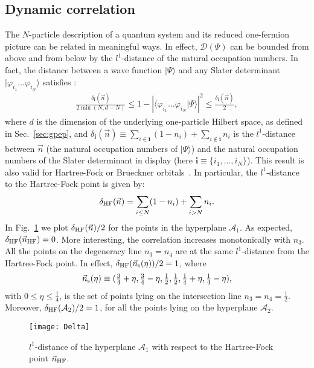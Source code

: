 \documentclass[aps,twocolumn,showpacs,pra,superscriptaddress,floatfix,longbibliography]{revtex4-1}
\newcommand{\7}{\dagger}
\newcommand{\bra}[1]{\mbox{$\langle #1 |$}}
\newcommand{\ket}[1]{\mbox{$| #1 \rangle$}}
\newcommand{\ii}{\bm{i}}
\begin{document}
  \subsection{Dynamic correlation}
  
The $N$-particle description of a quantum system 
 and its reduced one-fermion picture can be
related in meaningful ways. In effect, 
$\mathcal{D}(\Psi)$
can be bounded from above and from below by the 
$l^1$-distance of the natural occupation numbers. In fact, the 
distance between a wave function  $\ket{\Psi}$ and any 
Slater determinant $\ket{\varphi_{i_1}\dots\varphi_{i_N}}$
satisfies \cite{CS2013}:
\begin{align}
\frac{\delta_{\ii}(\vec n)}{2 \min (N,d-N) } \leq 1 - | 
\bra{\varphi_{i_1}\dots\varphi_{i_N}} \Psi\rangle|^2 \leq 
\frac{\delta_{\ii}(\vec n)}2,
\end{align}
where $d$ is the dimension of the underlying one-particle Hilbert space,
as defined in Sec.~\ref{sec:gpep},
and $\delta_{\ii}(\vec n) \equiv \sum_{i\in \ii} (1 - n_i) + 
\sum_{i \notin \ii} n_i$ is the $l^1$-distance between $\vec n$
(the natural occupation numbers of $\ket{\Psi}$) and
the natural occupation numbers of the Slater determinant
in display (here $\ii \equiv \{i_1,\dots,i_N\}$). This 
result is also valid for Hartree-Fock or Brueckner 
orbitals~\cite{newpaper,Zhan}. In particular, 
the $l^1$-distance to the Hartree-Fock point is given by:
\begin{align}
  \label{dynamicalcorr}
  \delta_{\rm HF}(\vec n) = \sum_{i \leq N} (1 - n_i) + 
\sum_{i > N} n_i.
\end{align}
In Fig.~\ref{graf:DHF} we plot $\delta_{\rm HF}(\vec n)/2$
for the points in the hyperplane $\mathcal{A}_1$. As 
expected, $\delta_{\rm HF}(\vec n_{\rm HF}) = 0$. More 
interesting, the correlation increases monotonically
with $n_3$. All the points on the degeneracy line $n_3 = n_4$
are at the same $l^1$-distance from the Hartree-Fock point. 
In effect, 
$\delta_{\rm HF}(\vec n_{\rm s}(\eta))/2 = 1$,
where 
\begin{align}
\label{eq:staticstate}
\vec n_{\rm s}(\eta) \equiv (\tfrac34 + \eta, \tfrac34 - \eta,
\tfrac12, \tfrac12, \tfrac14 + \eta, \tfrac14 - \eta),
\end{align}
with $0 \leq \eta \leq \tfrac14$, is the set of points lying on 
the intersection line $n_3 = n_4 = \tfrac12$.
Moreover, 
$\delta_{\rm HF}(\mathcal{A}_2)/2 = 1$, for all the points 
lying on the
hyperplane $\mathcal{A}_2$.

\begin{figure}[ht] 
 \centering
\texttt{[image: Delta]}
\caption{$l^1$-distance of the hyperplane $\mathcal{A}_1$ 
with respect to the Hartree-Fock point $\vec n_{\rm HF}$.}
 \label{graf:DHF}
 \end{figure}
 
\end{document}
